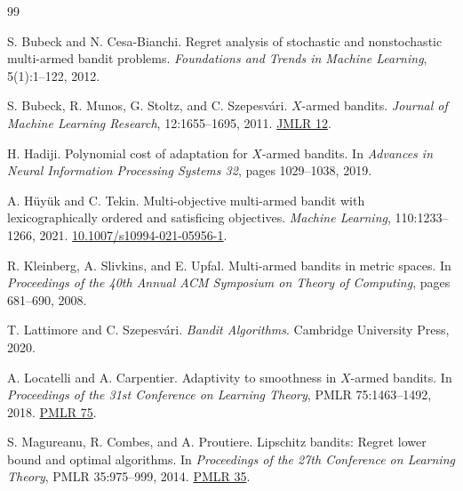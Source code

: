 \documentclass[11pt]{article}
\theoremstyle{definition}
\begin{document}
\begin{thebibliography}{99}

S. Bubeck and N. Cesa-Bianchi.
\newblock Regret analysis of stochastic and nonstochastic multi-armed bandit problems.
\newblock \emph{Foundations and Trends in Machine Learning}, 5(1):1--122, 2012.

S. Bubeck, R. Munos, G. Stoltz, and C. Szepesv\'ari.
\newblock $X$-armed bandits.
\newblock \emph{Journal of Machine Learning Research}, 12:1655--1695, 2011.
\newblock \href{https://www.jmlr.org/papers/v12/bubeck11a.html}{JMLR 12}.

H. Hadiji.
\newblock Polynomial cost of adaptation for $X$-armed bandits.
\newblock In \emph{Advances in Neural Information Processing Systems 32}, pages 1029--1038, 2019.

A. H\"uy\"uk and C. Tekin.
\newblock Multi-objective multi-armed bandit with lexicographically ordered and satisficing objectives.
\newblock \emph{Machine Learning}, 110:1233--1266, 2021.
\newblock \href{https://doi.org/10.1007/s10994-021-05956-1}{10.1007/s10994-021-05956-1}.

R. Kleinberg, A. Slivkins, and E. Upfal.
\newblock Multi-armed bandits in metric spaces.
\newblock In \emph{Proceedings of the 40th Annual ACM Symposium on Theory of Computing}, pages 681--690, 2008.

T. Lattimore and C. Szepesv\'ari.
\newblock \emph{Bandit Algorithms}.
\newblock Cambridge University Press, 2020.

A. Locatelli and A. Carpentier.
\newblock Adaptivity to smoothness in $X$-armed bandits.
\newblock In \emph{Proceedings of the 31st Conference on Learning Theory}, PMLR 75:1463--1492, 2018.
\newblock \href{https://proceedings.mlr.press/v75/locatelli18a.html}{PMLR 75}.

S. Magureanu, R. Combes, and A. Proutiere.
\newblock Lipschitz bandits: Regret lower bound and optimal algorithms.
\newblock In \emph{Proceedings of the 27th Conference on Learning Theory}, PMLR 35:975--999, 2014.
\newblock \href{https://proceedings.mlr.press/v35/magureanu14.html}{PMLR 35}.


\end{thebibliography}
\end{document}
